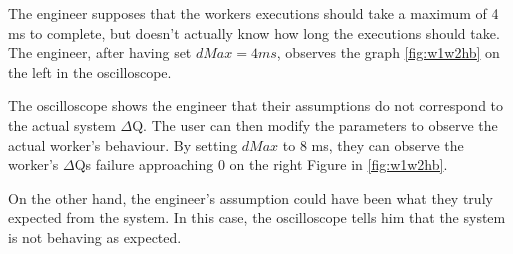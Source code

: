         The engineer supposes that the workers executions should take a maximum of 4 ms to complete, but doesn't actually know how long the executions should take. The engineer, after having set $dMax = 4ms$, observes the graph \cref{fig:w1w2hb} on the left in the oscilloscope.

    The oscilloscope shows the engineer that their assumptions do not correspond to the actual system $\Delta$Q. The user can then modify the parameters to observe the actual worker's behaviour. By setting $dMax$ to 8 ms, they can observe the worker's $\Delta$Qs failure approaching $0$ on the right Figure in \cref{fig:w1w2hb}.

    On the other hand, the engineer's assumption could have been what they truly expected from the system. In this case, the oscilloscope tells him that the system is not behaving as expected. 

